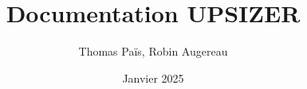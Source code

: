 \documentclass[10pt]{datasheet}
\title{Documentation UPSIZER}
\author{Thomas Païs, Robin Augereau}
\date{Janvier 2025}
\begin{document}
\maketitle

\newpage
\tableofcontents
\newpage

\cite{latexcompanion}







\end{document}
